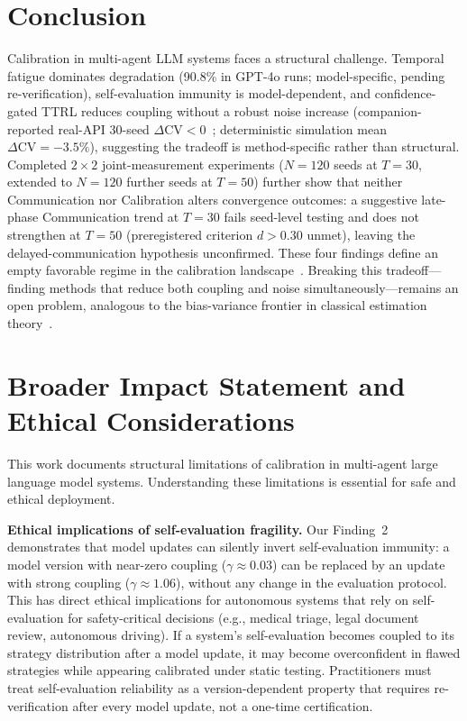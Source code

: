 \documentclass[11pt]{article}
\newcommand{\CV}{\ensuremath{\mathrm{CV}}}
\theoremstyle{definition}
\theoremstyle{remark}
\begin{document}
\section{Conclusion}

Calibration in multi-agent LLM systems faces a structural challenge. Temporal fatigue dominates degradation (90.8\% in GPT-4o runs; model-specific, pending re-verification), self-evaluation immunity is model-dependent, and confidence-gated TTRL reduces coupling without a robust noise increase (companion-reported real-API 30-seed $\Delta\CV < 0$~\citep{companion2026}; deterministic simulation mean $\Delta\CV = -3.5\%$), suggesting the tradeoff is method-specific rather than structural. Completed $2 \times 2$ joint-measurement experiments ($N{=}120$ seeds at $T{=}30$, extended to $N{=}120$ further seeds at $T{=}50$) further show that neither Communication nor Calibration alters convergence outcomes: a suggestive late-phase Communication trend at $T{=}30$ fails seed-level testing and does not strengthen at $T{=}50$ (preregistered criterion $d > 0.30$ unmet), leaving the delayed-communication hypothesis unconfirmed. These four findings define an empty favorable regime in the calibration landscape~\citep{cover2012elements}. Breaking this tradeoff---finding methods that reduce both coupling and noise simultaneously---remains an open problem, analogous to the bias-variance frontier in classical estimation theory~\citep{lehmann1998theory}.

\section*{Broader Impact Statement and Ethical Considerations}

This work documents structural limitations of calibration in multi-agent large language model systems. Understanding these limitations is essential for safe and ethical deployment.

\textbf{Ethical implications of self-evaluation fragility.} Our Finding~2 demonstrates that model updates can silently invert self-evaluation immunity: a model version with near-zero coupling ($\gamma \approx 0.03$) can be replaced by an update with strong coupling ($\gamma \approx 1.06$), without any change in the evaluation protocol. This has direct ethical implications for autonomous systems that rely on self-evaluation for safety-critical decisions (e.g., medical triage, legal document review, autonomous driving). If a system's self-evaluation becomes coupled to its strategy distribution after a model update, it may become overconfident in flawed strategies while appearing calibrated under static testing. Practitioners must treat self-evaluation reliability as a version-dependent property that requires re-verification after every model update, not a one-time certification.
\end{document}
